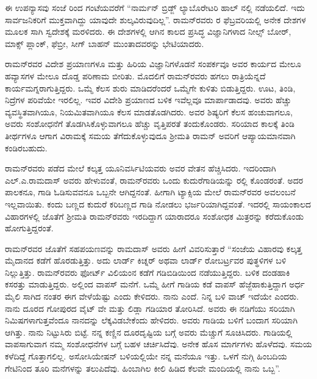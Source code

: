 ಈ ಉಪನ್ಯಾಸವು ಸಂಜೆ  ರಿಂದ  ಗಂಟೆಯವರೆಗೆ “ನಾರ್ಮನ್ ಬ್ರಿಡ್ಜ್ ಲ್ಯಾಬೊರೇಟರಿ ಹಾಲ್ ನಲ್ಲಿ ನಡೆಯಲಿದೆ. ಇದು ಸಾರ್ವಜನಿಕರಿಗೆ ಮುಕ್ತವಾಗಿದ್ದು ಯಾವುದೇ ಶುಲ್ಕವಿರುವುದಿಲ್ಲ”. ರಾಮನ್‍ರವರು ರ ಫೆಬ್ರವರಿಯಲ್ಲಿ ಅನೇಕ ದೇಶಗಳ ಮೂಲಕ ಸಾಗಿ ಸ್ವದೇಶಕ್ಕೆ ಮರಳಿದರು. ಈ ದೇಶಗಳಲ್ಲಿ ಆಗಿನ ಕಾಲದ ಪ್ರಸಿದ್ಧ ವಿಜ್ಞಾನಿಗಳಾದ ನೀಲ್ಸ್ ಬೋರ್, ಮಾಕ್ಸ್ ಪ್ಲಾಂಕ್, ಫೆಬ್ರೀ, ಸೀಗ್ ಬಾಹನ್ ಮುಂತಾದವರನ್ನು ಭೇಟಿಯಾದರು.

ರಾಮನ್‍ರವರ ವಿದೇಶ ಪ್ರಯಾಣಗಳೂ ಮತ್ತು ಹಿರಿಯ ವಿಜ್ಞಾನಿಗಳೊಡನೆ ಸಂಪರ್ಕವೂ ಅವರ ಕಾರ್ಯದ ಮೇಲೂ ಹವ್ಯಾಸಗಳ ಮೇಲೂ ದೊಡ್ಡ ಪರಿಣಾಮ ಬೀರಿತು. ಮೊದಲಿಗೆ ರಾಮನ್‍ರವರು ಹಗಲು ರಾತ್ರಿಯೆನ್ನದೆ ಕಾರ್ಯಮಗ್ನರಾಗುತ್ತಿದ್ದರು. ಒಮ್ಮೆ ಕೆಲಸ ಶುರು ಮಾಡಿದರೆಂದರೆ ಒಮ್ಮೆಗೇ ಕುಳಿತು ಬಿಡುತ್ತಿದ್ದರು. ಊಟ, ತಿಂಡಿ, ನಿದ್ರೆಗಳ ಪರಿವೆಯೇ ಇರಲಿಲ್ಲ. ಇವರ ವಿದೇಶಿ ಪ್ರಯಾಣದ ಬಳಿಕ ಇವೆಲ್ಲವೂ ಮಾರ್ಪಾಡಾದವು. ಅವರು ಹೆಚ್ಚು ವ್ಯವಸ್ಥಿತವಾಗಿಯೂ, ನಿಯಮಿತವಾಗಿಯೂ ಕೆಲಸ ಮಾಡತೊಡಗಿದರು. ಅವರ ಶಿಷ್ಯರಿಗೆ ಕೆಲಸ ಹಂಚುವಾಗಲೂ, ಅವರು ಸಂಶೋಧನೆಗೆ ತೊಡಗಿಸಿಕೊಳ್ಳುವಾಗಲೂ ಹೆಚ್ಚು ವೃತ್ತಿಪರತೆ ತಂದುಕೊಂಡರು. ಸರಿಯಾದ ಕಾಲಕ್ಕೆ ತಿಂಡಿ ತೀರ್ಥಗಳೂ ಆಗಾಗ ವಿರಾಮಕ್ಕೆ ಸಮಯ ತೆಗೆದುಕೊಳ್ಳುವುದೂ ಶ‍್ರೀಮತಿ ರಾಮನ್ ಅವರಿಗೆ ಆಪ್ಯಾಯಮಾನವಾಗಿ ಕಂಡಿರಬಹುದು. 

ರಾಮನ್‍ರವರು  ಪಡೆದ ಮೇಲೆ ಕಲ್ಕತ್ತ ಯೂನಿವರ್ಸಿಟಿಯವರು ಅವರ ವೇತನ ಹೆಚ್ಚಿಸಿದರು. ಇದರಿಂದಾಗಿ ಎಲ್.ಎ.ರಾಮದಾಸ್ ಅವರು ಹೇಳುವಂತೆ, ರಾಮನ್‍ರವರು ಒಂದು ಕುದುರೆಗಾಡಿಯನ್ನು ರಲ್ಲಿ ಕೊಂಡರಂತೆ. ಅದರ ಪಾಲಕನೂ, ಗಾಡಿ ಓಡಿಸುವವನೂ ಒಬ್ಬನೇ ಆಗಿದ್ದನಂತೆ. ಹೀಗಾಗಿ ಟ್ಯಾಕ್ಸಿಯ ಮೇಲೆ ರಾಮನ್‍ರವರ ಅವಲಂಬನೆ ಇಲ್ಲವಾಯಿತು. ಕಂದು ಬಣ್ಣದ ಕುದುರೆ ಕರಿಬಣ್ಣದ ಗಾಡಿ ನೋಡಲು ಭರ್ಜರಿಯಾಗಿದ್ದವಂತೆ. ಇದರಲ್ಲಿ ಸಾಯಂಕಾಲದ ವಿಹಾರಗಳಲ್ಲಿ ಜೊತೆಗೆ ಶ‍್ರೀಮತಿ ರಾಮನ್‍ರವರು ಇರದಿದ್ದಾಗ ಯಾರಾದರೂ ಸಂಶೋಧಕ ಮಿತ್ರರನ್ನು ಕರೆದುಕೊಂಡು ಹೋಗುತ್ತಿದ್ದರಂತೆ. 

ರಾಮನ್‍ರವರ ಜೊತೆಗೆ ಸಹಪಯಣವನ್ನು ರಾಮದಾಸ್ ಅವರು ಹೀಗೆ ವಿವರಿಸುತ್ತಾರೆ \enginline{-} “ಸಂಜೆಯ ವಿಹಾರವು ಕಲ್ಕತ್ತ ಮೈದಾನದ ಕಡೆಗೆ ಹೊರಡುತ್ತಿತ್ತು. ಅದು ಲಾರ್ಡ್ ಕಿಚ್ನರ್ ಅಥವಾ ಲಾರ್ಡ್ ರೋಬರ್ಟ್ರವರ ಪುತ್ಥಳಿಗಳ ಬಳಿ ನಿಲ್ಲುತ್ತಿತ್ತು. ರಾಮನ್‍ರವರು ಫೋರ್ಟ್ ವಿಲಿಯಂನ ಕಡೆಗೆ ಗಡಿಬಿಡಿಯಿಂದ ನಡೆಯುತ್ತಿದ್ದರು. ಬಳಿಕ ದಂಡಹಾಕಿ ಕಸರತ್ತು ಮಾಡುತ್ತಿದ್ದರು. ಅಲ್ಲಿಂದ ವಾಪಸ್ ಮನೆಗೆ. ಒಮ್ಮೆ ಹೀಗೆ ಗಾಡಿಯ ಕಡೆ ವಾಪಸ್ ಹೆಜ್ಜೆಹಾಕುತ್ತಿದ್ದಾಗ ಅರ್ಧ ಮೈಲಿ ಸಾಗಿದ ನಂತರ ಈಗ ವೇಳೆಯೆಷ್ಟು ಎಂದು ಕೇಳಿದರು. ನಾನು  ಎಂದೆ. ನಿನ್ನ ಬಳಿ ವಾಚ್ ಇದೆಯೇ ಎಂದರು. ನಾನು ದೂರದ ಗೋಪುರದ ವೈಟ್ ವೇ ಮತ್ತು ಲಿಡ್ಲಾ ಗಡಿಯಾರ ತೋರಿಸಿದೆ. ಅವರು ಈ ನಡಿಗೆಯು ಸರಿಯಾಗಿ  ನಿಮಿಷಗಳಾಗುತ್ತವೆಂದೂ ನಾನದನ್ನು ಲೆಕ್ಕವಿಡಬೇಕೆಂದು ಹೇಳಿದರು. ಅವರು ಗಾಡಿಯ ಬಳಿಗೆ ಬಂದಾಗ ಸರಿಯಾಗಿ  ಆಗಿತ್ತು. ನಾನು ನಿಟ್ಟುಸಿರು ಬಿಟ್ಟೆ. ನನ್ನ ಕಣ್ಣಿನ ದೂರದೃಷ್ಟಿಯ ಬಗ್ಗೆ ಅವರು ಮೆಚ್ಚುಗೆ ಸೂಚಿಸಿದರು. ಗಾಡಿಯಲ್ಲಿ ವಾಪಸಾಗುವಾಗ ನಮ್ಮ ಸಂಶೋಧನೆಗಳ ಬಗ್ಗೆ ಬಹಳ ಚರ್ಚಿಸಿದೆವು. ಅನೇಕ ಹೊಸ ಮಾರ್ಗಗಳು ಹೊಳೆದವು. ಸಮಯ ಕಳೆದಿದ್ದೆ ಗೊತ್ತಾಗಲಿಲ್ಲ. ಅಸೋಸಿಯೇಷನ್ ಬಳಿಯಲ್ಲಿಯೇ ನನ್ನ ಮನೆಯೂ ಇತ್ತು. ಒಳಗೆ ನುಗ್ಗಿ ಹಿಂಬದಿಯ ಗೇಟಿನಿಂದ ತೂರಿ ಮನೆಗಳನ್ನು ತಲುಪಿದೆವು. ಹಿಂಬಾಗಿಲ ಕೀಲಿ ಹಿಡಿದ ಕೆಲವೇ ಮಂದಿಯಲ್ಲಿ ನಾನು ಒಬ್ಬ”.



